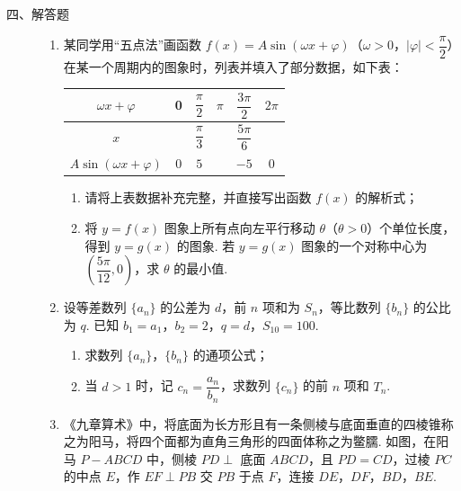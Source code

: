 \begin{description}

    \item[四、解答题]

    \begin{enumerate}[leftmargin=5pt]

      \addtocounter{enumi}{+16}

        \item 某同学用“五点法”画函数 \(f(x)=A\sin(\omega x+\varphi)\)（\(\omega>0\)，\(|\varphi|<\dfrac{\pi}{2}\)）在某一个周期内的图象时，列表并填入了部分数据，如下表：

\begin{center}
\renewcommand{\arraystretch}{1.25}
\begin{tabular}{|c|c|c|c|c|c|}
\hline
\(\omega x+\varphi\) & 0 & \(\dfrac{\pi}{2}\) & \(\pi\) & \(\dfrac{3\pi}{2}\) & \(2\pi\) \\
\hline
\(x\) &  & \(\dfrac{\pi}{3}\) &  & \(\dfrac{5\pi}{6}\) &  \\
\hline
\(A\sin(\omega x+\varphi)\) & \(0\) & \(5\) &  & \(-5\) & \(0\) \\
\hline
\end{tabular}
\end{center}

\begin{enumerate}
\item 请将上表数据补充完整，并直接写出函数 \(f(x)\) 的解析式；
\item 将 \(y=f(x)\) 图象上所有点向左平行移动 \(\theta\)（\(\theta>0\)）个单位长度，得到 \(y=g(x)\) 的图象. 若 \(y=g(x)\) 图象的一个对称中心为 \(\left(\dfrac{5\pi}{12},0\right)\)，求 \(\theta\) 的最小值.
\end{enumerate}

        \item 设等差数列 \(\{a_n\}\) 的公差为 \(d\)，前 \(n\) 项和为 \(S_n\)，等比数列 \(\{b_n\}\) 的公比为 \(q\). 已知 \(b_1=a_1\)，\(b_2=2\)，\(q=d\)，\(S_{10}=100\).

\begin{enumerate}
\item 求数列 \(\{a_n\}\)，\(\{b_n\}\) 的通项公式；
\item 当 \(d>1\) 时，记 \(c_n=\dfrac{a_n}{b_n}\)，求数列 \(\{c_n\}\) 的前 \(n\) 项和 \(T_n\).
\end{enumerate}

        \item 《九章算术》中，将底面为长方形且有一条侧棱与底面垂直的四棱锥称之为阳马，将四个面都为直角三角形的四面体称之为鳖臑. 如图，在阳马 \(P-ABCD\) 中，侧棱 \(PD\perp\) 底面 \(ABCD\)，且 \(PD=CD\)，过棱 \(PC\) 的中点 \(E\)，作 \(EF\perp PB\) 交 \(PB\) 于点 \(F\)，连接 \(DE\)，\(DF\)，\(BD\)，\(BE\).


\end{enumerate}
\end{description}
